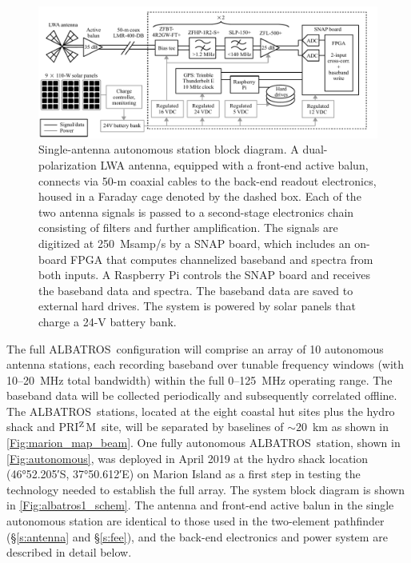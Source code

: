 \documentclass{ws-jai}
\def\albatros{ALBATROS}
\def\prizm{PRI$^{\rm Z}$M}
\begin{document}
\begin{figure}
  \begin{center}
    \includegraphics[width=\linewidth]{Figures/albatros_single_schematic/albatros_single_schematic.pdf}
    \caption{Single-antenna autonomous station block diagram.  A
      dual-polarization LWA antenna, equipped with a front-end active
      balun, connects via 50-m coaxial cables to the back-end readout
      electronics, housed in a Faraday cage denoted by the dashed box.
      Each of the two antenna signals is passed to a second-stage
      electronics chain consisting of filters and further
      amplification.  The signals are digitized at 250~Msamp/s by a
      SNAP board, which includes an on-board FPGA that computes
      channelized baseband and spectra from both inputs.  A Raspberry
      Pi controls the SNAP board and receives the baseband data and
      spectra.  The baseband data are saved to external hard drives.
      The system is powered by solar panels that charge a 24-V battery
      bank.}
    \label{Fig:albatros1_schem}
  \end{center}
\end{figure}

The full \albatros\ configuration will comprise an array of 10
autonomous antenna stations, each recording baseband over tunable
frequency windows (with 10--20~MHz total bandwidth) within the full
0--125~MHz operating range.  The baseband data will be collected
periodically and subsequently correlated offline.  The
\albatros\ stations, located at the eight coastal hut sites plus the
hydro shack and \prizm\ site, will be separated by baselines of
$\sim20$~km as shown in \autoref{Fig:marion_map_beam}. One fully
autonomous \albatros\ station, shown in \autoref{Fig:autonomous}, was
deployed in April 2019 at the hydro shack location (\ang{46;52.205;}S,
\ang{37;50.612;}E) on Marion Island as a first step in testing the
technology needed to establish the full array.  The system block
diagram is shown in \autoref{Fig:albatros1_schem}.  The antenna and
front-end active balun in the single autonomous station are identical
to those used in the two-element pathfinder (\S\ref{s:antenna} and
\S\ref{s:fee}), and the back-end electronics and power system are
described in detail below.
\end{document}

